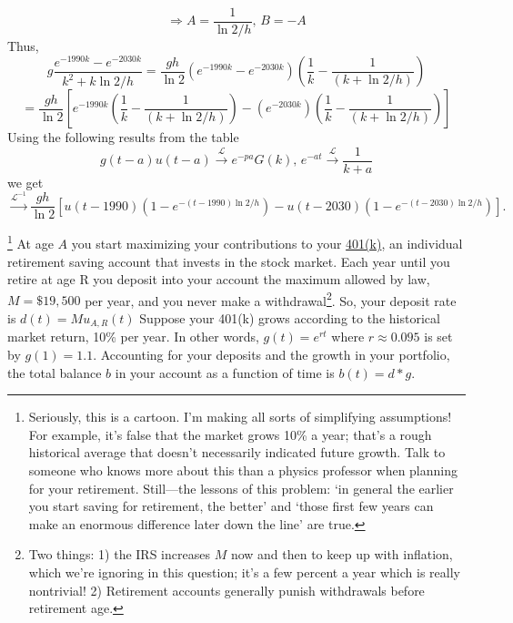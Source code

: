 \documentclass[answers]{exam}\newcommand{\repositoryInformationSetup}{     \usepackage[dvipsnames]{xcolor}     \usepackage[ angle=90, color=black, opacity=1, scale=2, ]{background}      \SetBgPosition{current page.west}      \SetBgVshift{-4.5mm}      \backgroundsetup{contents={{\color{green}\texttt{-{}-} differs from commit \texttt{40a9b87} in 0 files}}} } \newcommand{\commit}{{{\color{green}40a9b87}}}\usepackage{amsmath}
\begin{document}
\begin{questions}
\begin{solution}
		$$ \Rightarrow A = \frac{1}{\ln2/h} \textbf{, } B = -A $$
		Thus,
		$$ g \frac{e^{-1990k} - e^{-2030k}}{k^2+k\ln2/h} = \frac{gh}{\ln2} (e^{-1990k} - e^{-2030k})(\frac{1}{k} - \frac{1}{(k + \ln2/h)}) $$
		$$ = \frac{gh}{\ln2} \left[ e^{-1990k}(\frac{1}{k} - \frac{1}{(k + \ln2/h)}) - (e^{-2030k}) (\frac{1}{k} - \frac{1}{(k + \ln2/h)})\right] $$
		Using the following results from the table
		$$ g(t-a)u(t-a) \stackrel{\mathcal{L}}{\rightarrow} e^{-pa}G(k) \textbf{, } e^{-at} \stackrel{\mathcal{L}}{\rightarrow} \frac{1}{k+a}$$
		we get
		$$\stackrel{\mathcal{L}^{-1}}{\rightarrow}  \frac{gh}{\ln 2} \left[u(t-1990)\left(1-e^{-(t-1990) \ln 2/h} \right)- u(t-2030)\left(1-e^{-(t-2030) \ln 2 / h}\right)\right].$$

	\end{solution}

	\footnote{
		Seriously, this is a cartoon.
		I'm making all sorts of simplifying assumptions!
		For example, it's false that the market grows 10\% a year; that's a rough historical average that doesn't necessarily indicated future growth.
		Talk to someone who knows more about this than a physics professor when planning for your retirement.
		Still---the lessons of this problem:
		`in general the earlier you start saving for retirement, the better'
		and
		`those first few years can make an enormous difference later down the line' are true.
	}
	At age $A$ you start maximizing your contributions to your \href{https://en.wikipedia.org/wiki/401(k)}{401(k)}, an individual retirement saving account that invests in the stock market.
	Each year until you retire at age R you deposit into your account the maximum allowed by law, $M=\$19,500$ per year, and you never make a withdrawal\footnote{
		Two things:
		1) the IRS increases $M$ now and then to keep up with inflation, which we're ignoring in this question; it's a few percent a year which is really nontrivial!
		2) Retirement accounts generally punish withdrawals before retirement age.
	}.
	So, your deposit rate is $d(t) = M u_{A,R}(t)$
	Suppose your 401(k) grows according to the historical market return, 10\% per year.
	In other words, $g(t) = e^{rt}$ where $r\approx 0.095$ is set by $g(1) = 1.1$.
	Accounting for your deposits and the growth in your portfolio, the total balance $b$ in your account as a function of time is $b(t) = d*g$.

\end{questions}
\end{document}
